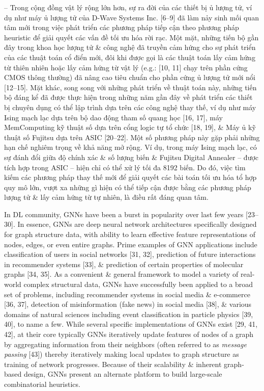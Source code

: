 \documentclass{article}
\begin{document}
\begin{itemize}
    -- Trong cộng đồng vật lý rộng lớn hơn, sự ra đời của các thiết bị ủ lượng tử, ví dụ như máy ủ lượng tử của D-Wave Systems Inc. [6--9] đã làm nảy sinh mối quan tâm mới trong việc phát triển các phương pháp tiếp cận theo phương pháp heuristic để giải quyết các vấn đề tối ưu hóa rời rạc. Một mặt, những tiến bộ gần đây trong khoa học lượng tử \& công nghệ đã truyền cảm hứng cho sự phát triển của các thuật toán cổ điển mới, đôi khi được gọi là các thuật toán lấy cảm hứng từ thiên nhiên hoặc lấy cảm hứng từ vật lý (e.g.:  [10, 11] chạy trên phần cứng CMOS thông thường) đã nâng cao tiêu chuẩn cho phần cứng ủ lượng tử mới nổi [12--15]. Mặt khác, song song với những phát triển về thuật toán này, những tiến bộ đáng kể đã được thực hiện trong những năm gần đây về phát triển các thiết bị chuyên dụng có thể lập trình dựa trên các công nghệ thay thế, ví dụ như máy Ising mạch lạc dựa trên bộ dao động tham số quang học [16, 17], máy MemComputing kỹ thuật số dựa trên cổng logic tự tổ chức [18, 19], \& Máy ủ kỹ thuật số Fujitsu dựa trên ASIC [20–22]. Một số phương pháp này gặp phải những hạn chế nghiêm trọng về khả năng mở rộng. Ví dụ, trong máy Ising mạch lạc, có sự đánh đổi giữa độ chính xác \& số lượng biến \& Fujitsu Digital Annealer -- được tích hợp trong ASIC -- hiện chỉ có thể xử lý tối đa 8192 biến. Do đó, việc tìm kiếm các phương pháp thay thế mới để giải quyết các bài toán tối ưu hóa tổ hợp quy mô lớn, vượt xa những gì hiện có thể tiếp cận được bằng các phương pháp lượng tử \& lấy cảm hứng từ tự nhiên, là điều rất đáng quan tâm.

    In DL community, GNNs have been a burst in popularity over last few years [23–30]. In essence, GNNs are deep neural network architectures specifically designed for graph structure data, with ability to learn effective feature representations of nodes, edges, or even entire graphs. Prime examples of GNN applications include classification of users in social networks [31, 32], prediction of future interactions in recommender systems [33], \& prediction of certain properties of molecular graphs [34, 35]. As a convenient \& general framework to model a variety of real-world complex structural data, GNNs have successfully been applied to a broad set of problems, including recommender systems in social media \& e-commerce [36, 37], detection of misinformation (fake news) in social media [38], \& various domains of natural sciences including event classification in particle physics [39, 40], to name a few. While several specific implementations of GNNs exist [29, 41, 42], at their core typically GNNs iteratively update features of nodes of a graph by aggregating information from their neighbors (often referred to as {\it message passing} [43]) thereby iteratively making local updates to graph structure as training of network progresses. Because of their scalability \& inherent graph-based design, GNNs present an alternate platform to build large-scale combinatorial heuristics.


\end{itemize}
\end{document}

